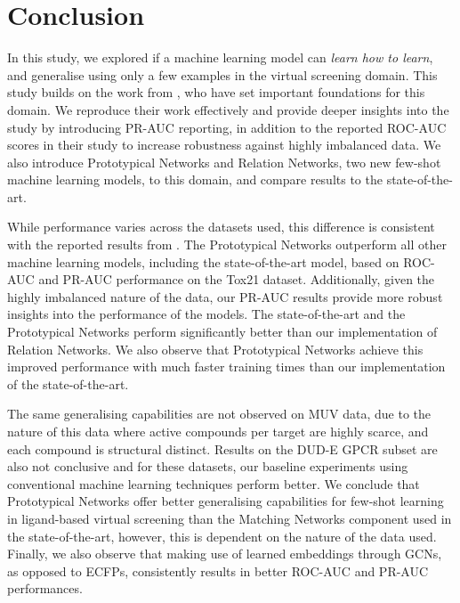 \section{Conclusion}

In this study, we explored if a machine learning model can \textit{learn how to learn}, and generalise using only a few examples in the virtual screening domain. This study builds on the work from \citet{altae2017low}, who have set important foundations for this domain. We reproduce their work effectively and provide deeper insights into the study by introducing PR-AUC reporting, in addition to the reported ROC-AUC scores in their study to increase robustness against highly imbalanced data. We also introduce Prototypical Networks and Relation Networks, two new few-shot machine learning models, to this domain, and compare results to the state-of-the-art.

While performance varies across the datasets used, this difference is consistent with the reported results from \citet{altae2017low}. The Prototypical Networks outperform all other machine learning models, including the state-of-the-art model, based on ROC-AUC and PR-AUC performance on the Tox21 dataset. Additionally, given the highly imbalanced nature of the data, our PR-AUC results provide more robust insights into the performance of the models. The state-of-the-art and the Prototypical Networks perform significantly better than our implementation of Relation Networks. We also observe that Prototypical Networks achieve this improved performance with much faster training times than our implementation of the state-of-the-art. 

The same generalising capabilities are not observed on MUV data, due to the nature of this data where active compounds per target are highly scarce, and each compound is structural distinct. Results on the DUD-E GPCR subset are also not conclusive and for these datasets, our baseline experiments using conventional machine learning techniques perform better. We conclude that Prototypical Networks offer better generalising capabilities for few-shot learning in ligand-based virtual screening than the Matching Networks component used in the state-of-the-art, however, this is dependent on the nature of the data used. Finally, we also observe that making use of learned embeddings through GCNs, as opposed to ECFPs, consistently results in better ROC-AUC and PR-AUC performances.

